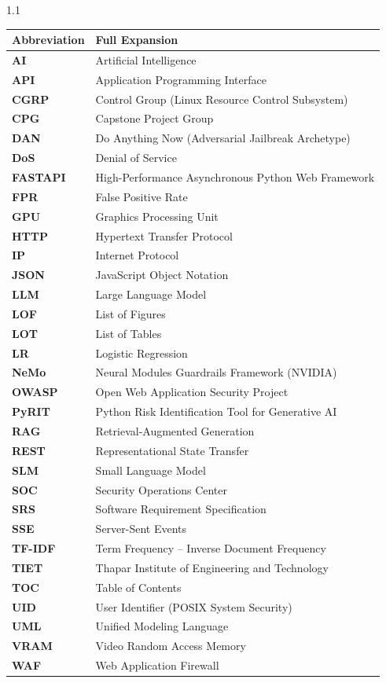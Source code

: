 \documentclass[12pt,a4paper,oneside]{report}
\begin{document}
\begin{spacing}{1.1}
\noindent
\small
\begin{tabularx}{\textwidth}{@{}p{1.2in} X@{}}
\rowcolor{HeaderGray} \textbf{Abbreviation} & \textbf{Full Expansion} \\
\hline
\textbf{AI} & Artificial Intelligence \\
\textbf{API} & Application Programming Interface \\
\textbf{CGRP} & Control Group (Linux Resource Control Subsystem) \\
\textbf{CPG} & Capstone Project Group \\
\textbf{DAN} & Do Anything Now (Adversarial Jailbreak Archetype) \\
\textbf{DoS} & Denial of Service \\
\textbf{FASTAPI} & High-Performance Asynchronous Python Web Framework \\
\textbf{FPR} & False Positive Rate \\
\textbf{GPU} & Graphics Processing Unit \\
\textbf{HTTP} & Hypertext Transfer Protocol \\
\textbf{IP} & Internet Protocol \\
\textbf{JSON} & JavaScript Object Notation \\
\textbf{LLM} & Large Language Model \\
\textbf{LOF} & List of Figures \\
\textbf{LOT} & List of Tables \\
\textbf{LR} & Logistic Regression \\
\textbf{NeMo} & Neural Modules Guardrails Framework (NVIDIA) \\
\textbf{OWASP} & Open Web Application Security Project \\
\textbf{PyRIT} & Python Risk Identification Tool for Generative AI \\
\textbf{RAG} & Retrieval-Augmented Generation \\
\textbf{REST} & Representational State Transfer \\
\textbf{SLM} & Small Language Model \\
\textbf{SOC} & Security Operations Center \\
\textbf{SRS} & Software Requirement Specification \\
\textbf{SSE} & Server-Sent Events \\
\textbf{TF-IDF} & Term Frequency -- Inverse Document Frequency \\
\textbf{TIET} & Thapar Institute of Engineering and Technology \\
\textbf{TOC} & Table of Contents \\
\textbf{UID} & User Identifier (POSIX System Security) \\
\textbf{UML} & Unified Modeling Language \\
\textbf{VRAM} & Video Random Access Memory \\
\textbf{WAF} & Web Application Firewall \\
\hline
\end{tabularx}
\end{spacing}
\end{document}
